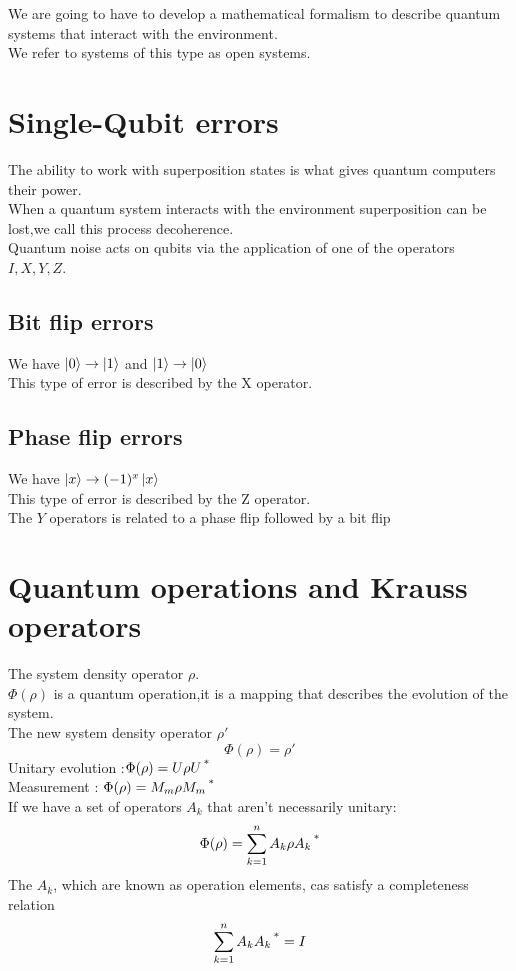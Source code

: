 \documentclass[12pt,oneside]{book}
\begin{document}
We are going to have to develop a mathematical formalism to describe quantum systems that interact with the environment.\\
We refer to systems of this type as open systems.
\section{Single-Qubit errors}
    The ability to work with superposition states is what gives quantum computers their power.\\
    When a quantum system interacts with the environment  superposition can be lost,we call this process decoherence.\\
    Quantum noise acts on qubits via the application of one of the operators $I,X,Y,Z$.\\
    \subsection{Bit flip errors}
        We have $\ket{0} \to \ket{1}$ and $\ket{1} \to \ket{0}$\\
        This type of error is described by the X operator.
    \subsection{Phase flip errors}
        We have $\ket{x}\to (-1)^x\ket{x}$\\
        This type of error is described by the Z operator. \\

    The $Y$ operators is related to a phase flip followed by a bit flip
\section{Quantum operations and Krauss operators}
    The system density operator $\rho$.\\
    $\Phi(\rho)$ is a quantum operation,it is a mapping that describes the evolution of the system.\\
    The new system density operator $\rho'$
    \[\Phi(\rho) = \rho'\]
    Unitary evolution :$\Phi(\rho) = U\rho U\operatorname{^*}$\\
    Measurement : $\Phi(\rho) = M_m\rho M_m\operatorname{^*}$ \\

    If we have a set of operators $A_k$ that aren't necessarily unitary:
    \[ \Phi(\rho) = \sum_{k=1}^nA_k\rho A_k\operatorname{^*} \]
    The $A_k$, which are known as operation elements, cas satisfy a completeness relation 
    \[ \sum_{k=1}^n A_kA_k\operatorname{^*} = I \]
\end{document}
